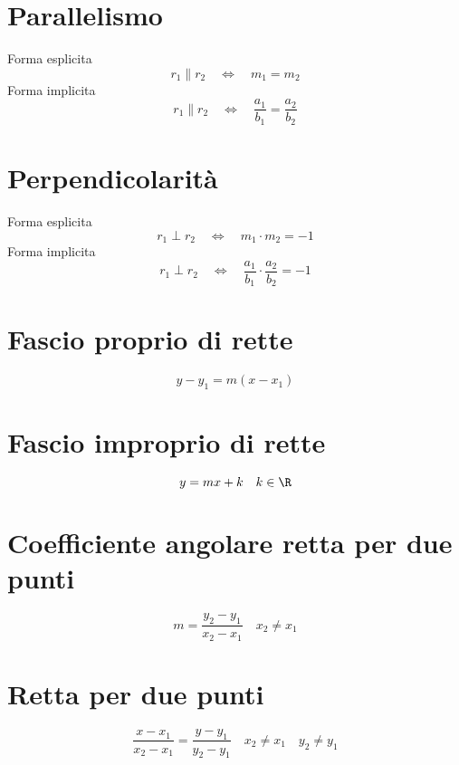 \section{Parallelismo}
Forma esplicita
\begin{equation}
r_1\parallel r_2\quad\Longleftrightarrow\quad	m_1=m_2
\end{equation}
Forma implicita
\begin{equation}
r_1\parallel r_2\quad\Longleftrightarrow\quad \dfrac{a_1}{b_1}=\dfrac{a_2}{b_2}
\end{equation}
\section{Perpendicolarità}
Forma esplicita
\begin{equation}
r_1\perp r_2\quad\Longleftrightarrow\quad	m_1 \cdot m_2=-1
\end{equation}
Forma implicita
\begin{equation}
r_1\perp r_2\quad\Longleftrightarrow\quad	\dfrac{a_1}{b_1}\cdot\dfrac{a_2}{b_2}=-1
\end{equation}
\section{Fascio proprio di rette}
\begin{equation}
y-y_1=m(x-x_1)
\end{equation}
\section{Fascio improprio di rette}
\begin{equation}
y=mx+k\quad k\in\R
\end{equation}
\section{Coefficiente angolare retta per due punti}
\begin{equation}
m=\dfrac{y_2-y_1}{x_2-x_1}\quad x_2\neq x_1
\end{equation}
\section{Retta per due punti}
\begin{equation}
\dfrac{x-x_1}{x_2-x_1}=\dfrac{y-y_1}{y_2-y_1}\quad x_2\neq x_1\quad y_2\neq y_1
\end{equation}
